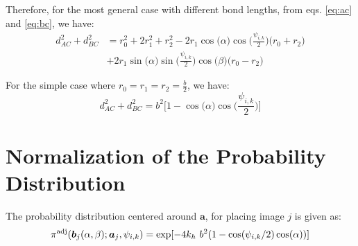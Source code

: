         Therefore, for the most general case with different bond lengths, from eqs. \eqref{eq:ac} and \eqref{eq:bc}, we have:
        \begin{equation}
            \begin{aligned}
                d_{AC}^2 + d_{BC}^2 &= r_0^2 + 2  r_1^2 + r_2^2 - 2  r_1  \cos \big( \alpha \big)  \cos \Big(\displaystyle\frac{\psi_{i,k}}{2}\Big)  \big( r_0 + r_2 \big)\\
                &+ 2  r_1  \sin \big( \alpha \big)  \sin \Big(\displaystyle\frac{\psi_{i,k}}{2}\Big)  \cos \big( \beta \big)  \big( r_0 - r_2 \big)
            \end{aligned}
        \end{equation}

        For the simple case where $r_0 = r_1 = r_2 = \displaystyle\frac{b}{2}$, we have:
        \begin{equation}
        \label{eq:final}
            d_{AC}^2 + d_{BC}^2 = b^2  \Big[ 1 - \cos \big( \alpha \big)  \cos \Big(\displaystyle\frac{\psi_{i,k}}{2}\Big) \Big]
        \end{equation}
    \section{Normalization of the Probability Distribution}
    \label{Appendix C}
    The probability distribution centered around ${\mathbf a}$, for placing image $j$ is given as:
    \begin{equation}
    \label{eq:piTildeAlphaBeta}
            \pi^\text{adj}({\boldsymbol {b}}_j(\alpha, \beta);{\boldsymbol {a}}_j,\psi_{i,k}) = \exp[-4k_h~b^2 (1 - \cos(\psi_{i,k}/2) \cos(\alpha))]
    \end{equation}

